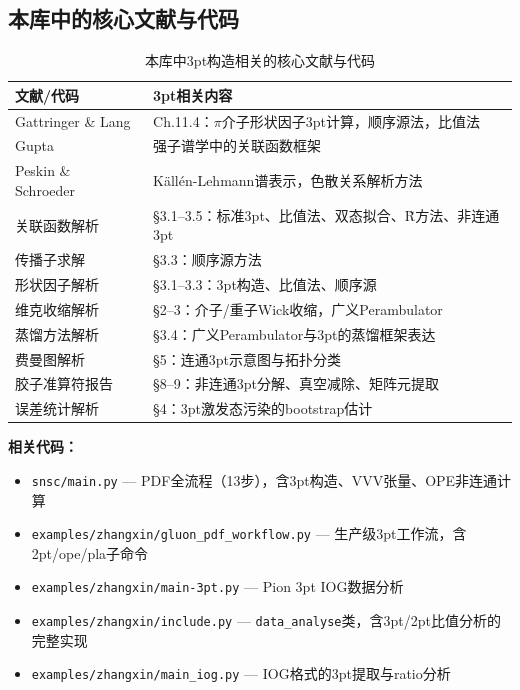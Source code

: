 \documentclass[12pt,a4paper]{ctexart}
\theoremstyle{definition}
\begin{document}
\subsection{本库中的核心文献与代码}

\begin{table}[H]
\centering
\caption{本库中3pt构造相关的核心文献与代码}
\begin{tabular}{ll}
\toprule
\textbf{文献/代码} & \textbf{3pt相关内容} \\
\midrule
Gattringer \& Lang~\cite{GattringerLang2010} & Ch.11.4：$\pi$介子形状因子3pt计算，顺序源法，比值法 \\
Gupta~\cite{GuptaLatticeQCD} & 强子谱学中的关联函数框架 \\
Peskin \& Schroeder~\cite{PeskinSchroeder1995} & K\"all\'en-Lehmann谱表示，色散关系解析方法 \\
关联函数解析~\cite{correlationFunctions2026} & §3.1--3.5：标准3pt、比值法、双态拟合、R̃方法、非连通3pt \\
传播子求解~\cite{propagatorSolvers2026} & §3.3：顺序源方法 \\
形状因子解析~\cite{formFactors2026} & §3.1--3.3：3pt构造、比值法、顺序源 \\
维克收缩解析~\cite{wickContraction2026} & §2--3：介子/重子Wick收缩，广义Perambulator \\
蒸馏方法解析~\cite{distillation2026} & §3.4：广义Perambulator与3pt的蒸馏框架表达 \\
费曼图解析~\cite{feynmanDiagrams2026} & §5：连通3pt示意图与拓扑分类 \\
胶子准算符报告~\cite{gluonQuasiOpReport2026} & §8--9：非连通3pt分解、真空减除、矩阵元提取 \\
误差统计解析~\cite{errorStats2026} & §4：3pt激发态污染的bootstrap估计 \\
\bottomrule
\end{tabular}
\end{table}

\textbf{相关代码：}
\begin{itemize}[leftmargin=*]
    \item \texttt{snsc/main.py} — PDF全流程（13步），含3pt构造、VVV张量、OPE非连通计算~\cite{snscMain2026}
    \item \texttt{examples/zhangxin/gluon\_pdf\_workflow.py} — 生产级3pt工作流，含2pt/ope/pla子命令
    \item \texttt{examples/zhangxin/main-3pt.py} — Pion 3pt IOG数据分析
    \item \texttt{examples/zhangxin/include.py} — \texttt{data\_analyse}类，含3pt/2pt比值分析的完整实现
    \item \texttt{examples/zhangxin/main\_iog.py} — IOG格式的3pt提取与ratio分析
\end{itemize}
\end{document}
